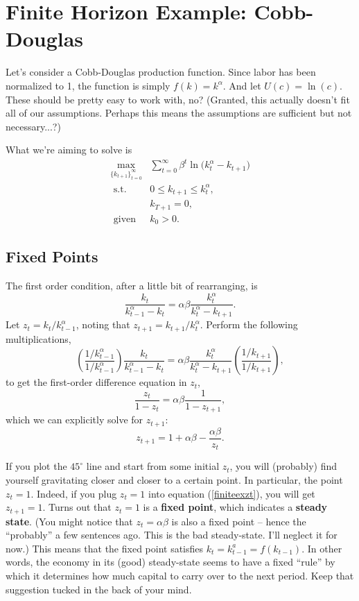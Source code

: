 \documentclass[12pt]{article}
\theoremstyle{definition}
\begin{document}
\section{Finite Horizon Example: Cobb-Douglas}

Let's consider a Cobb-Douglas production function. Since labor has been normalized to 1, the function is simply $f(k)=k^{\alpha}$. And let $U(c)=\ln(c)$. These should be pretty easy to work with, no? (Granted, this actually doesn't fit all of our assumptions. Perhaps this means the assumptions are sufficient but not necessary...?)

What we're aiming to solve is 
\begin{align}
	\max_{ \{k_{t+1} \}_{t =0}^{\infty} } &\sum_{t = 0}^{\infty} \beta^t \ln\big( k_t^{\alpha} - k_{t + 1} \big) \label{spobjective}\\
	\text{ s.t. } \;\; &0 \leq k_{t+1} \leq k_t^{\alpha}, \label{spcond}\\
		&k_{T+1}=0,\\
	\text{ given} \;\; &k_0 > 0.
\end{align}


\subsection{Fixed Points}

The first order condition, after a little bit of rearranging, is
	\[\frac{k_t}{k_{t-1}^{\alpha} - k_t}= \alpha \beta \frac{ k_t^{\alpha}}{k_t^{\alpha} - k_{t+1}}.	\]
Let $z_t = k_t / k_{t - 1}^{\alpha}$, noting that $z_{t+1} = k_{t+1} / k_{t }^{\alpha}$. Perform the following multiplications,
	\[ \left(\frac{ 1 / k^{\alpha}_{t - 1}}{1 / k^{\alpha}_{t - 1}}\right) \frac{k_t}{k_{t-1}^{\alpha} - k_t}= \alpha \beta \frac{ k_t^{\alpha}}{k_t^{\alpha} - k_{t+1}} \left( \frac{1/k_{t + 1}}{1 / k_{t + 1}}\right),	\]
	to get the first-order difference equation in $z_t$, 
	\[
		\frac{z_t}{1 -z_t} = \alpha \beta \frac{  1}{1- z_{t+1}},
	\]
which we can explicitly solve for $z_{t+1}$:
\begin{equation}
	z_{t + 1} = 1 + \alpha \beta - \frac{\alpha \beta}{z_t}. \label{finiteexzt}
\end{equation}

If you plot the $45^{\circ}$ line and start from some initial $z_t$,  you will (probably) find yourself gravitating closer and closer to a certain point. In particular, the point $z_t=1$. Indeed, if you plug $z_t=1$ into equation (\ref{finiteexzt}), you will get $z_{t+1}=1$. Turns out that $z_t=1$ is a \textbf{fixed point}, which indicates a \textbf{steady state}. (You might notice that $z_t=\alpha \beta$ is also a fixed point -- hence the ``probably'' a few sentences ago. This is the bad steady-state. I'll neglect it for now.) This means that the fixed point satisfies $ k_t =  k_{t - 1}^a = f(k_{t-1})$. In other words, the economy in its (good) steady-state seems to have a fixed ``rule'' by which it determines how much capital to carry over to the next period. Keep that suggestion tucked in the back of your mind. 
\end{document}
